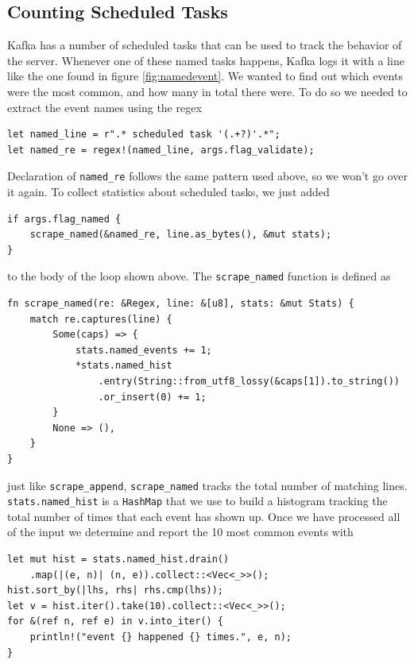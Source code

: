 \subsection{Counting Scheduled Tasks}

Kafka has a number of scheduled tasks that can be used to track
the behavior of the server. Whenever one of these named
tasks happens, Kafka logs it with a line like the one
found in figure \ref{fig:namedevent}. We wanted to find out which
events were the most common, and how many in total there were.
To do so we needed to extract the event names using the
regex

\begin{verbatim}
let named_line = r".* scheduled task '(.+?)'.*";
let named_re = regex!(named_line, args.flag_validate);
\end{verbatim}

Declaration of \verb'named_re' follows the same pattern used above,
so we won't go over it again. To collect statistics about scheduled
tasks, we just added

\begin{verbatim}
if args.flag_named {
    scrape_named(&named_re, line.as_bytes(), &mut stats);
}
\end{verbatim}

\noindent
to the body of the loop shown above. The \verb'scrape_named'
function is defined as

\begin{verbatim}
fn scrape_named(re: &Regex, line: &[u8], stats: &mut Stats) {
    match re.captures(line) {
        Some(caps) => {
            stats.named_events += 1;
            *stats.named_hist
                .entry(String::from_utf8_lossy(&caps[1]).to_string())
                .or_insert(0) += 1;
        }
        None => (),
    }
}
\end{verbatim}

\noindent
just like \verb'scrape_append', \verb'scrape_named'
tracks the total number of matching lines. \verb'stats.named_hist'
is a \verb'HashMap' that we use to build a histogram tracking the
total number of times that each event has shown up. Once we have
processed all of the input we determine and report the 10 most common
events with

\begin{verbatim}
let mut hist = stats.named_hist.drain()
    .map(|(e, n)| (n, e)).collect::<Vec<_>>();
hist.sort_by(|lhs, rhs| rhs.cmp(lhs));
let v = hist.iter().take(10).collect::<Vec<_>>();
for &(ref n, ref e) in v.into_iter() {
    println!("event {} happened {} times.", e, n);
}
\end{verbatim}

